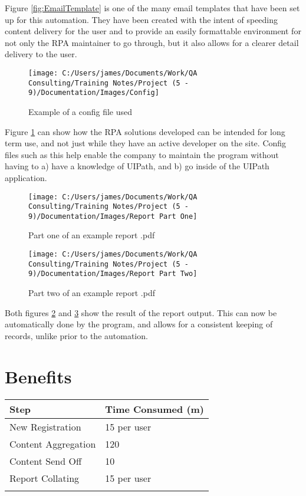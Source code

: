 \documentclass[12]{article}
\begin{document}
Figure \ref{fig:EmailTemplate} is one of the many email templates that have been set up for this automation. They have been created with the intent of speeding content delivery for the user and to provide an easily formattable environment for not only the RPA maintainer to go through, but it also allows for a clearer detail delivery to the user.

\begin{figure}[H]
	\centering
	\texttt{[image: C:/Users/james/Documents/Work/QA Consulting/Training Notes/Project (5 - 9)/Documentation/Images/Config]}
	\caption{Example of a config file used}
	\label{fig:Config}
\end{figure}

Figure \ref{fig:Config} can show how the RPA solutions developed can be intended for long term use, and not just while they have an active developer on the site. Config files such as this help enable the company to maintain the program without having to a) have a knowledge of UIPath, and b) go inside of the UIPath application. 

\begin{figure}[H]
	\centering
	\texttt{[image: C:/Users/james/Documents/Work/QA Consulting/Training Notes/Project (5 - 9)/Documentation/Images/Report Part One]}
	\caption{Part one of an example report .pdf}
	\label{fig:ReportOne}
\end{figure}

\begin{figure}[H]
	\centering
	\texttt{[image: C:/Users/james/Documents/Work/QA Consulting/Training Notes/Project (5 - 9)/Documentation/Images/Report Part Two]}
	\caption{Part two of an example report .pdf}
	\label{fig:ReportTwo}
\end{figure}

Both figures \ref{fig:ReportOne} and \ref{fig:ReportTwo} show the result of the report output. This can now be automatically done by the program, and allows for a consistent keeping of records, unlike prior to the automation.

\section{Benefits}

\begin{table}[H]
\centering
\begin{tabular}{|l|l|}
\hline
Step                & Time Consumed (m) \\ \hline
New Registration    & 15 per user       \\
Content Aggregation & 120               \\
Content Send Off    & 10                \\
Report Collating    & 15 per user       \\
                    &                  
\end{tabular}
\end{table}
\end{document}
